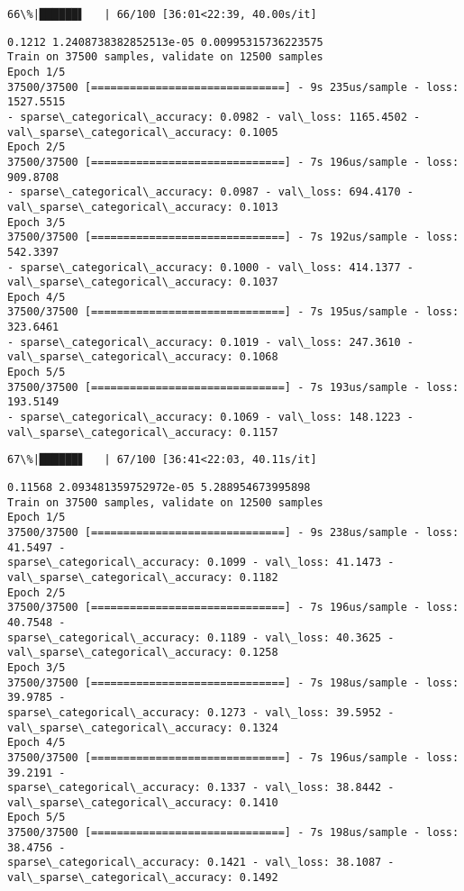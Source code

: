 \documentclass[11pt]{article}
\begin{document}
    \begin{Verbatim}[commandchars=\\\{\}]
 66\%|██████▌   | 66/100 [36:01<22:39, 40.00s/it]
    \end{Verbatim}

    \begin{Verbatim}[commandchars=\\\{\}]
0.1212 1.2408738382852513e-05 0.00995315736223575
Train on 37500 samples, validate on 12500 samples
Epoch 1/5
37500/37500 [==============================] - 9s 235us/sample - loss: 1527.5515
- sparse\_categorical\_accuracy: 0.0982 - val\_loss: 1165.4502 -
val\_sparse\_categorical\_accuracy: 0.1005
Epoch 2/5
37500/37500 [==============================] - 7s 196us/sample - loss: 909.8708
- sparse\_categorical\_accuracy: 0.0987 - val\_loss: 694.4170 -
val\_sparse\_categorical\_accuracy: 0.1013
Epoch 3/5
37500/37500 [==============================] - 7s 192us/sample - loss: 542.3397
- sparse\_categorical\_accuracy: 0.1000 - val\_loss: 414.1377 -
val\_sparse\_categorical\_accuracy: 0.1037
Epoch 4/5
37500/37500 [==============================] - 7s 195us/sample - loss: 323.6461
- sparse\_categorical\_accuracy: 0.1019 - val\_loss: 247.3610 -
val\_sparse\_categorical\_accuracy: 0.1068
Epoch 5/5
37500/37500 [==============================] - 7s 193us/sample - loss: 193.5149
- sparse\_categorical\_accuracy: 0.1069 - val\_loss: 148.1223 -
val\_sparse\_categorical\_accuracy: 0.1157
    \end{Verbatim}

    \begin{Verbatim}[commandchars=\\\{\}]
 67\%|██████▋   | 67/100 [36:41<22:03, 40.11s/it]
    \end{Verbatim}

    \begin{Verbatim}[commandchars=\\\{\}]
0.11568 2.093481359752972e-05 5.288954673995898
Train on 37500 samples, validate on 12500 samples
Epoch 1/5
37500/37500 [==============================] - 9s 238us/sample - loss: 41.5497 -
sparse\_categorical\_accuracy: 0.1099 - val\_loss: 41.1473 -
val\_sparse\_categorical\_accuracy: 0.1182
Epoch 2/5
37500/37500 [==============================] - 7s 196us/sample - loss: 40.7548 -
sparse\_categorical\_accuracy: 0.1189 - val\_loss: 40.3625 -
val\_sparse\_categorical\_accuracy: 0.1258
Epoch 3/5
37500/37500 [==============================] - 7s 198us/sample - loss: 39.9785 -
sparse\_categorical\_accuracy: 0.1273 - val\_loss: 39.5952 -
val\_sparse\_categorical\_accuracy: 0.1324
Epoch 4/5
37500/37500 [==============================] - 7s 196us/sample - loss: 39.2191 -
sparse\_categorical\_accuracy: 0.1337 - val\_loss: 38.8442 -
val\_sparse\_categorical\_accuracy: 0.1410
Epoch 5/5
37500/37500 [==============================] - 7s 198us/sample - loss: 38.4756 -
sparse\_categorical\_accuracy: 0.1421 - val\_loss: 38.1087 -
val\_sparse\_categorical\_accuracy: 0.1492
    \end{Verbatim}
\end{document}
